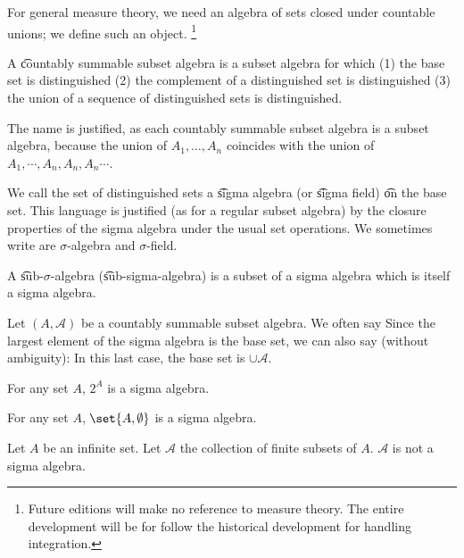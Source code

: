 

For general measure theory, we need an algebra of sets closed under countable unions; we define such an object.
  \ifhmode\unskip\fi\footnote{
Future editions will make no reference to measure theory. The entire development will be for follow the historical development for handling integration.
  }


A \t{countably summable subset algebra} is a subset algebra for which (1) the base set is distinguished (2) the complement of a distinguished set is distinguished (3) the union of a sequence of distinguished sets is distinguished.

The name is justified, as each countably summable subset algebra is a subset algebra, because the union of $A_1, \dots, A_n$ coincides with the union of $A_1, \cdots, A_n, A_n, A_n \cdots$.

We call the set of distinguished sets a \t{sigma algebra} (or \t{sigma field}) \t{on} the base set.
This language is justified (as for a regular subset algebra) by the closure properties of the sigma algebra under the usual set operations.
We sometimes write are $\sigma $-algebra and $\sigma $-field.

A \t{sub-$\sigma $-algebra} (\t{sub-sigma-algebra}) is a subset of a sigma algebra which is itself a sigma algebra.


Let $(A, \mathcal{A} )$ be a countably summable subset algebra.
We often say 
Since the largest element of the sigma algebra is the base set, we can also say (without ambiguity): 
In this last case, the base set is $\cup \mathcal{A} $.


\begin{expl}
For any set $A$, $2^{A}$ is a sigma algebra.
\end{expl}

\begin{expl}
For any set $A$,
$\set{A, \emptyset}$ is a sigma algebra.
\end{expl}

\begin{expl}
Let $A$ be an infinite set.
Let $\mathcal{A} $ the collection
of finite subsets of $A$.
$\mathcal{A} $ is not a sigma algebra.
\end{expl}

